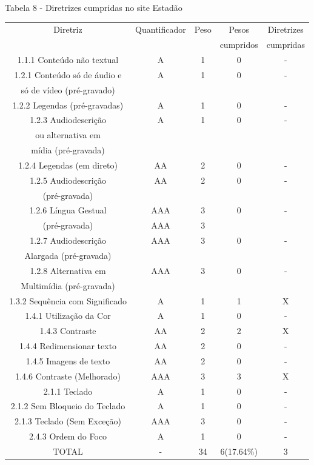 \documentclass[a4paper]{article}
\begin{document}
\begin{titlepage}
Tabela 8 - Diretrizes cumpridas no site Estadão\\[-1cm]
\begin{center}
	\fontsize{8pt}{8pt}\selectfont	
	\begin{longtable}{|c|c|c|c|c|}
		\hline
		Diretriz & Quantificador & Peso & Pesos & Diretrizes\\
		& & & cumpridos & cumpridas\\
		\hline
		1.1.1 Conteúdo não textual & A & 1 & 0 & - \\
		\hline
		1.2.1 Conteúdo só de áudio e & A & 1 & 0 & - \\
		só de vídeo (pré-gravado) & & & & \\
		\hline
		1.2.2 Legendas (pré-gravadas) & A & 1 & 0 & - \\
		\hline
		1.2.3 Audiodescrição & A & 1 & 0 & - \\
		ou alternativa em & & & & \\
		mídia (pré-gravada) & & & & \\
		\hline
		1.2.4 Legendas (em direto) & AA & 2 & 0 & - \\
		\hline
		1.2.5 Audiodescrição & AA & 2 & 0 & - \\
		(pré-gravada) & & & & \\
		\hline
		1.2.6 Língua Gestual & AAA & 3 & 0 & - \\
		(pré-gravada) & AAA & 3 & & \\
		\hline
		1.2.7 Audiodescrição & AAA & 3 & 0 & - \\
		Alargada (pré-gravada) & & & & \\
		\hline
		1.2.8 Alternativa em & AAA & 3 & 0 & - \\
		Multimídia (pré-gravada) & & & & \\
		\hline
		1.3.2 Sequência com Significado & A & 1 & 1 & X \\
		\hline
		1.4.1 Utilização da Cor & A & 1 & 0 & - \\
		\hline
		1.4.3 Contraste & AA & 2 & 2 & X \\
		\hline
		1.4.4 Redimensionar texto & AA & 2 & 0 & - \\
		\hline
		1.4.5 Imagens de texto & AA & 2 & 0 & - \\
		\hline
		1.4.6 Contraste (Melhorado) & AAA & 3 & 3 & X \\
		\hline
		2.1.1 Teclado & A & 1 & 0 & - \\
		\hline
		2.1.2 Sem Bloqueio do Teclado & A & 1 & 0 & - \\
		\hline
		2.1.3 Teclado (Sem Exceção) & AAA & 3 & 0 & - \\
		\hline
		2.4.3 Ordem do Foco & A & 1 & 0 & - \\
		\hline
		TOTAL & - & 34 & 6(17.64\%) & 3 \\
		\hline
	\end{longtable}
\end{center}


\end{titlepage}
\end{document}
